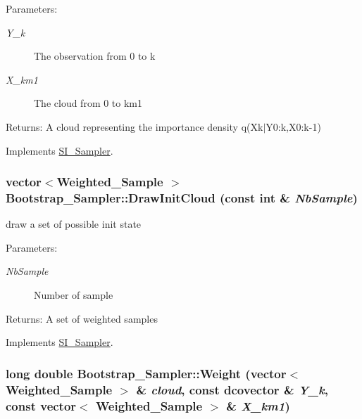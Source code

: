 \begin{Desc}
\item[Parameters:]
\begin{description}
\item[{\em Y\_\-k}]The observation from 0 to k \item[{\em X\_\-km1}]The cloud from 0 to km1\end{description}
\end{Desc}
\begin{Desc}
\item[Returns:]A cloud representing the importance density q(Xk$|$Y0:k,X0:k-1) \end{Desc}


Implements \hyperlink{class_s_i___sampler_62bf57181aeb5981426a71a7bf01c3e9}{SI\_\-Sampler}.\hypertarget{class_bootstrap___sampler_e36eb9258b052c41e075b350960d21a3}{
\subsubsection[{DrawInitCloud}]{\setlength{\rightskip}{0pt plus 5cm}vector$<${\bf Weighted\_\-Sample} $>$ Bootstrap\_\-Sampler::DrawInitCloud (const int \& {\em NbSample})}}
\label{class_bootstrap___sampler_e36eb9258b052c41e075b350960d21a3}


draw a set of possible init state 

\begin{Desc}
\item[Parameters:]
\begin{description}
\item[{\em NbSample}]Number of sample\end{description}
\end{Desc}
\begin{Desc}
\item[Returns:]A set of weighted samples \end{Desc}


Implements \hyperlink{class_s_i___sampler_3fbedf1ce189168da5608861d5a3289e}{SI\_\-Sampler}.\hypertarget{class_bootstrap___sampler_22ca201b958c0c873cfdbd1d545140dc}{
\subsubsection[{Weight}]{\setlength{\rightskip}{0pt plus 5cm}long double Bootstrap\_\-Sampler::Weight (vector$<$ {\bf Weighted\_\-Sample} $>$ \& {\em cloud}, \/  const dcovector \& {\em Y\_\-k}, \/  const vector$<$ {\bf Weighted\_\-Sample} $>$ \& {\em X\_\-km1})}}
\label{class_bootstrap___sampler_22ca201b958c0c873cfdbd1d545140dc}


